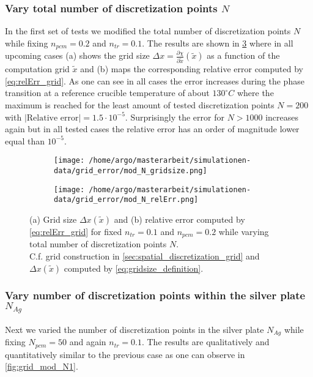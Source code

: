 \documentclass{scrartcl}[12pt, halfparskip]
\numberwithin{equation}{section}
\numberwithin{figure}{section}
\numberwithin{table}{section}
\begin{document}
\subsubsection{Vary total number of discretization points $N$}
In the first set of tests we modified the total number of discretization points $N$ while fixing $n_{pcm}=0.2$ and $n_{tr}=0.1$. The results are shown in \cref{fig:grid_mod_N} where in all upcoming cases (a) shows the grid size $\Delta x = \frac{\partial \chi}{\partial \tilde{x}}(\tilde{x})$ as a function of the computation grid $\tilde{x}$ and (b) maps the corresponding relative error computed by \cref{eq:relErr_grid}. As one can see in all cases the error increases during the phase transition at a reference crucible temperature of about $130^{\circ} C$ where the maximum is reached for the least amount of tested discretization points $N=200$ with $|\text{Relative error|}=1.5 \cdot 10^{-5}$. Surprisingly the error for $N > 1000$ increases again but in all tested cases the relative error has an order of magnitude lower equal than $10^{-5}$. 


\begin{figure}[H]
	\begin{subfigure}{0.49\textwidth}
		\texttt{[image: /home/argo/masterarbeit/simulationen-data/grid\_error/mod\_N\_gridsize.png]}
		\caption{}
		\label{fig:gridsize_mod_N}
	\end{subfigure}
	\begin{subfigure}{0.49\textwidth}
		\texttt{[image: /home/argo/masterarbeit/simulationen-data/grid\_error/mod\_N\_relErr.png]}
		\caption{}
		\label{fig:grid_relErr_mod_N}
	\end{subfigure}
	\caption{(a) Grid size $\Delta x(\tilde{x})$ and (b) relative error computed by \cref{eq:relErr_grid} for fixed $n_{tr}=0.1$ and $n_{pcm}=0.2$ while varying total number of discretization points $N$. \\
	C.f. grid construction in \cref{sec:spatial_discretization_grid} and $\Delta x(\tilde{x})$ computed by \cref{eq:gridsize_definition}.}
	\label{fig:grid_mod_N}
\end{figure}

\subsubsection{Vary number of discretization points within the silver plate $N_{Ag}$}
Next we varied the number of discretization points in the silver plate $N_{Ag}$ while fixing $N_{pcm}=50$ and again $n_{tr}=0.1$. The results are qualitatively and quantitatively similar to the previous case as one can observe in \cref{fig:grid_mod_N1}.
\end{document}
